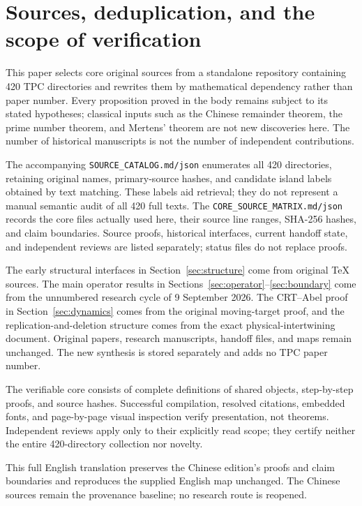 \section{Sources, deduplication, and the scope of verification}\label{sec:provenance}
This paper selects core original sources from a standalone repository containing 420 TPC directories and rewrites them by mathematical dependency rather than paper number.
Every proposition proved in the body remains subject to its stated hypotheses; classical inputs such as the Chinese remainder theorem, the prime number theorem, and Mertens' theorem are not new discoveries here.
The number of historical manuscripts is not the number of independent contributions.

The accompanying \texttt{SOURCE\_CATALOG.md/json} enumerates all 420 directories, retaining original names, primary-source hashes, and candidate island labels obtained by text matching.
These labels aid retrieval; they do not represent a manual semantic audit of all 420 full texts.
The \texttt{CORE\_SOURCE\_MATRIX.md/json} records the core files actually used here, their source line ranges, SHA-256 hashes, and claim boundaries.
Source proofs, historical interfaces, current handoff state, and independent reviews are listed separately; status files do not replace proofs.

The early structural interfaces in Section~\ref{sec:structure} come from original TeX sources.
The main operator results in Sections~\ref{sec:operator}--\ref{sec:boundary} come from the unnumbered research cycle of 9 September 2026.
The CRT--Abel proof in Section~\ref{sec:dynamics} comes from the original moving-target proof, and the replication-and-deletion structure comes from the exact physical-intertwining document.
Original papers, research manuscripts, handoff files, and maps remain unchanged. The new synthesis is stored separately and adds no TPC paper number.

The verifiable core consists of complete definitions of shared objects, step-by-step proofs, and source hashes.
Successful compilation, resolved citations, embedded fonts, and page-by-page visual inspection verify presentation, not theorems.
Independent reviews apply only to their explicitly read scope; they certify neither the entire 420-directory collection nor novelty.

This full English translation preserves the Chinese edition's proofs and claim boundaries and reproduces the supplied English map unchanged. The Chinese sources remain the provenance baseline; no research route is reopened.

